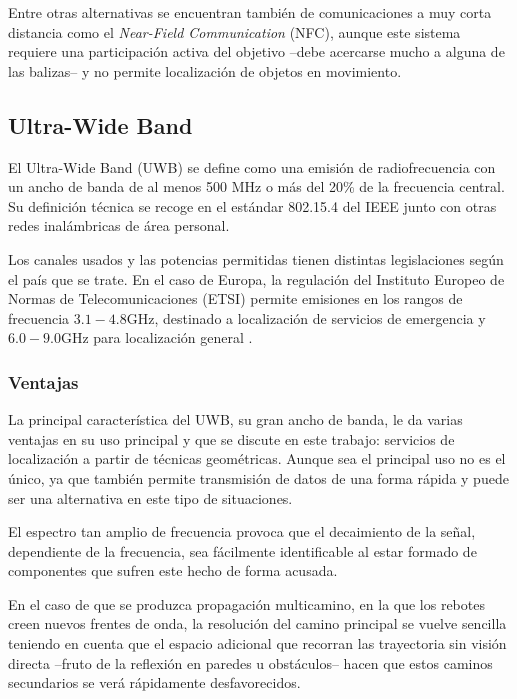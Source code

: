 Entre otras alternativas se encuentran también de comunicaciones a muy corta distancia como el \textit{Near-Field Communication} (NFC), aunque este sistema requiere una participación activa del objetivo --debe acercarse mucho a alguna de las balizas-- y no permite localización de objetos en movimiento.

\subsection{Ultra-Wide Band}

El Ultra-Wide Band (UWB) se define como una emisión de radiofrecuencia con un ancho de banda de al menos 500 MHz o más del 20\% de la frecuencia central.
Su definición técnica se recoge en el estándar 802.15.4 del IEEE junto con otras redes inalámbricas de área personal.

Los canales usados y las potencias permitidas tienen distintas legislaciones según el país que se trate.
En el caso de Europa, la regulación del Instituto Europeo de Normas de Telecomunicaciones (ETSI) permite emisiones en los rangos de frecuencia $3.1 - 4.8\si{\giga\hertz}$, destinado a localización de servicios de emergencia y  $6.0 - 9.0\si{\giga\hertz}$ para localización general \cite{UWB_regs}.

\subsubsection{Ventajas}

La principal característica del UWB, su gran ancho de banda, le da varias ventajas en su uso principal y que se discute en este trabajo: servicios de localización a partir de técnicas geométricas.
Aunque sea el principal uso no es el único, ya que también permite transmisión de datos de una forma rápida y puede ser una alternativa en este tipo de situaciones.

El espectro tan amplio de frecuencia provoca que el decaimiento de la señal, dependiente de la frecuencia, sea fácilmente identificable al estar formado de componentes que sufren este hecho de forma acusada.

En el caso de que se produzca propagación multicamino, en la que los rebotes creen nuevos frentes de onda, la resolución del camino principal se vuelve sencilla teniendo en cuenta que el espacio adicional que recorran las trayectoria sin visión directa --fruto de la reflexión en paredes u obstáculos-- hacen que estos caminos secundarios se verá rápidamente desfavorecidos.

